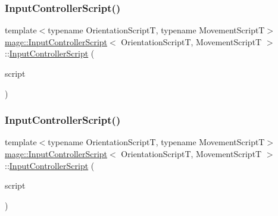 \subsubsection{\texorpdfstring{Input\+Controller\+Script()}{InputControllerScript()}\hspace{0.1cm}{\footnotesize\ttfamily [2/3]}}
{\footnotesize\ttfamily template$<$typename Orientation\+ScriptT, typename Movement\+ScriptT$>$ \\
\hyperlink{classmage_1_1_input_controller_script}{mage\+::\+Input\+Controller\+Script}$<$ Orientation\+ScriptT, Movement\+ScriptT $>$\+::\hyperlink{classmage_1_1_input_controller_script}{Input\+Controller\+Script} (\begin{DoxyParamCaption}\item[{const \hyperlink{classmage_1_1_input_controller_script}{Input\+Controller\+Script}$<$ Orientation\+ScriptT, Movement\+ScriptT $>$ \&}]{script }\end{DoxyParamCaption})\hspace{0.3cm}{\ttfamily [delete]}}

\hypertarget{classmage_1_1_input_controller_script_a18b905c7a204c22173dcaf19a9587f7d}{}\label{classmage_1_1_input_controller_script_a18b905c7a204c22173dcaf19a9587f7d} 
\subsubsection{\texorpdfstring{Input\+Controller\+Script()}{InputControllerScript()}\hspace{0.1cm}{\footnotesize\ttfamily [3/3]}}
{\footnotesize\ttfamily template$<$typename Orientation\+ScriptT, typename Movement\+ScriptT$>$ \\
\hyperlink{classmage_1_1_input_controller_script}{mage\+::\+Input\+Controller\+Script}$<$ Orientation\+ScriptT, Movement\+ScriptT $>$\+::\hyperlink{classmage_1_1_input_controller_script}{Input\+Controller\+Script} (\begin{DoxyParamCaption}\item[{\hyperlink{classmage_1_1_input_controller_script}{Input\+Controller\+Script}$<$ Orientation\+ScriptT, Movement\+ScriptT $>$ \&\&}]{script }\end{DoxyParamCaption})}

\hypertarget{classmage_1_1_input_controller_script_ac5699d9a4d9a3f9c456885a92dede979}{}\label{classmage_1_1_input_controller_script_ac5699d9a4d9a3f9c456885a92dede979} 
